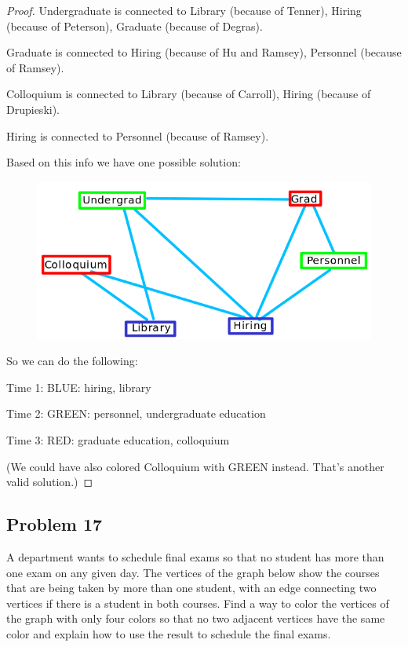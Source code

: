 \documentclass[14pt]{extarticle}
\begin{document}
\begin{proof}
Undergraduate is connected to Library (because of Tenner), Hiring (because of
Peterson), Graduate (because of Degras).

Graduate is connected to Hiring (because of Hu and Ramsey), Personnel (because
of Ramsey).

Colloquium is connected to Library (because of Carroll), Hiring (because of
Drupieski).

Hiring is connected to Personnel (because of Ramsey).

Based on this info we have one possible solution:
\begin{figure}[ht!]
\centering
\includegraphics[scale=0.5]{../images/1.4.16.sol.png}
\end{figure}

So we can do the following:

Time 1: BLUE: hiring, library

Time 2: GREEN: personnel, undergraduate education

Time 3: RED: graduate education, colloquium

(We could have also colored Colloquium with GREEN instead. That's another
valid solution.)
\end{proof}

\subsection{Problem 17}
A department wants to schedule final exams so that no student has more than one
exam on any given day. The vertices of the graph below show the courses that are
being taken by more than one student, with an edge connecting two vertices if
there is a student in both courses. Find a way to color the vertices of the
graph with only four colors so that no two adjacent vertices have the same color
and explain how to use the result to schedule the final exams.
\end{document}
